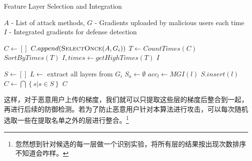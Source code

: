 \documentclass[conference]{IEEEtran}
\begin{document}
\begin{algorithm}
    \caption{Feature Layer Selection and Integration}
    \label{alg:featureLayerSelection}
    \begin{algorithmic}[1]
        \Require $A$ - List of attack methods, $G$ - Gradients uploaded by malicious users each time
        \Ensure $I$ - Integrated gradients for defense detection

            \State $C \gets \left [ \right ] $
                \State $C.append( \Call{SelectOnce}{A, G_i})$
            \EndFor
            \State $T \gets CountTimes(C)$
            \State $SortByTimes(T)$
            \State $I, times \gets getHighTimes(T)$
            \State \Return $I$
        \EndFunction

            \State $S \gets \left [  \right ] $
                \State $L \gets$ extract all layers from $G_i$
                \State $S_a \gets \emptyset$
                    \State $acc_l \gets MGI(l)$
                        \State $S.insert(l)$
                    \EndIf
                \EndFor
            \State $C \gets \bigcap\left \{ s | s\in S  \right \}$
            \EndFor
            \State \Return $C$
        \EndFunction


        


    \end{algorithmic}
\end{algorithm}

这样，对于恶意用户上传的梯度，我们就可以只提取这些层的梯度后整合到一起，再进行后续的防御检测。若为了防止恶意用户针对本算法进行攻击，可以每次随机选取一些在提取名单之外的层进行整合。\footnote{忽然想到针对候选的每一层做一个识别实验，将所有层的结果按出现次数排序不知道会咋样。}



\end{document}
